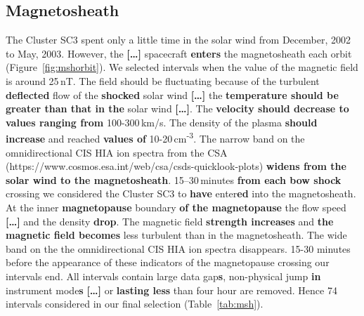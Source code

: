 \documentclass[linenumbers,draft]{agujournal}
\begin{document}
\subsection{Magnetosheath}
\label{sec:msh}

The Cluster SC3 spent only a little time in the solar wind from December, 2002 to May, 2003. However, the \textbf{[\dots]} spacecraft \textbf{enters} the magnetosheath  each orbit (Figure~\ref{fig:mshorbit}). We selected intervals when the value of the magnetic field is around 25\,nT. The field should be fluctuating because of the turbulent \textbf{deflected} flow of the \textbf{shocked} solar wind \textbf{[\dots]} the \textbf{temperature should be greater than that in the} solar wind \textbf{[\dots]}. The \textbf{velocity should decrease to values ranging from} 100-300\,km/s. The density of the plasma \textbf{should increase} and reached \textbf{values of} 10-20\,cm\textsuperscript{-3}.  The narrow band on the  omnidirectional CIS HIA ion spectra from the CSA (https://www.cosmos.esa.int/web/csa/csds-quicklook-plots) \textbf{widens from the solar wind to the magnetosheath}. 15--30\,minutes \textbf{from each bow shock} crossing we considered the Cluster SC3 to \textbf{have} enter\textbf{ed} into the magnetosheath. At the inner \textbf{magnetopause} boundary \textbf{of the magnetopause} the flow speed \textbf{[\dots]} and the density \textbf{drop}. The magnetic field \textbf{strength increases} and \textbf{the magnetic field becomes} less turbulent than in the magnetosheath. The wide band on the  the omnidirectional CIS HIA ion spectra disappears. 15-30 minutes before the appearance  of these indicators of the magnetopause crossing our intervals end. All intervals contain large data gap\textbf{s}, non-physical jump \textbf{in} instrument mode\textbf{s} \textbf{[\dots]} or \textbf{lasting less} than four hour are removed. Hence 74 intervals considered in our final selection (Table~\ref{tab:msh}). 
\end{document}

